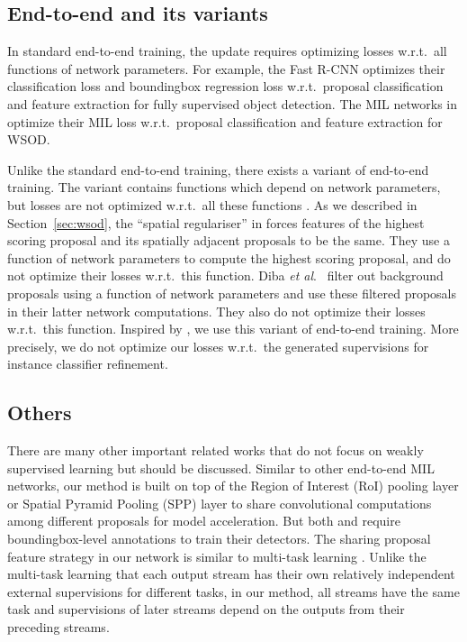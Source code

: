 \documentclass[10pt,journal,compsoc]{IEEEtran}
\def\wrt{w.r.t.} \def\dof{d.o.f.}
\def\etal{\emph{et al}.}
\begin{document}
{
\subsection{End-to-end and its variants}
\label{sec:eav}
In standard end-to-end training,
the update requires optimizing losses \wrt\ all functions of network parameters.
For example,
the Fast R-CNN \cite{Ref:Girshick2015} optimizes their classification loss and boundingbox regression loss \wrt\ proposal classification and feature extraction for fully supervised object detection.
The MIL networks in \cite{Ref:Tang2017deep,Ref:Kantorov2016} optimize their MIL loss \wrt\ proposal classification and feature extraction for WSOD.

Unlike the standard end-to-end training,
there exists a variant of end-to-end training.
The variant contains functions
which depend on network parameters,
but losses are not optimized \wrt\ all these functions \cite{Ref:Bilen2016,Ref:Diba2017}.
As we described in Section~\ref{sec:wsod},
the ``spatial regulariser'' in \cite{Ref:Bilen2016}
forces features of the highest scoring proposal and its spatially adjacent proposals to be the same.
They use a function of network parameters to compute the highest scoring proposal,
and do not optimize their losses \wrt\ this function.
Diba \etal\ \cite{Ref:Diba2017} filter out background proposals using a function of network parameters
and use these filtered proposals in their latter network computations.
They also do not optimize their losses \wrt\ this function.
Inspired by \cite{Ref:Bilen2016,Ref:Diba2017},
we use this variant of end-to-end training.
More precisely,
we do not optimize our losses \wrt\ the generated supervisions for instance classifier refinement.
}





\subsection{Others}

There are many other important related works that do not focus on weakly supervised learning but should be discussed.
Similar to other end-to-end MIL networks,
our method is built on top of the Region of Interest (RoI) pooling layer \cite{Ref:Girshick2015} or Spatial Pyramid Pooling (SPP) layer \cite{Ref:He2015}
to share convolutional computations among different proposals for model acceleration.
But both \cite{Ref:Girshick2015} and \cite{Ref:He2015} require boundingbox-level annotations to train their detectors.
The sharing proposal feature strategy in our network is similar to multi-task learning \cite{Ref:Caruana1997}.
Unlike the multi-task learning that each output stream has their own relatively independent external supervisions for different tasks,
in our method, all streams have the same task and supervisions of later streams depend on the outputs from their preceding streams.
\end{document}
